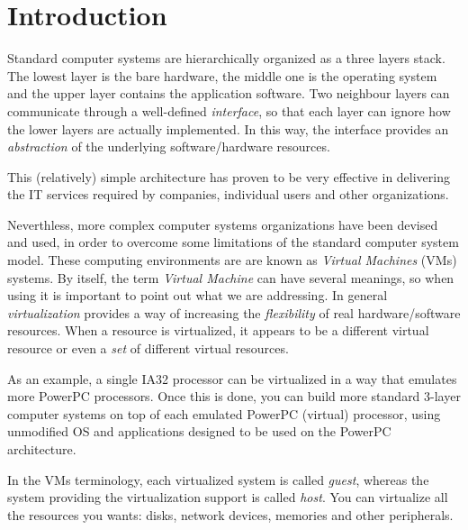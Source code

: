 \chapter{Introduction}

Standard computer systems are hierarchically organized as a three
layers stack. The lowest layer is the bare hardware, the middle one is the operating system and the 
upper layer contains the application software.
Two neighbour layers can communicate through a well-defined \emph{interface}, so that each layer can ignore how the
lower layers are actually implemented. In this way, the interface provides an \emph{abstraction} of the underlying software/hardware
resources.

This (relatively) simple architecture has proven to be very effective in delivering the IT services required
by companies, individual users and other organizations.

\vspace{0.5cm}

Neverthless, more complex computer systems organizations have been devised and used, in order to overcome some limitations
of the standard computer system model. These computing environments are are known as \emph{Virtual Machines} (VMs) systems.
By itself, the term \emph{Virtual Machine} can have several meanings, so when using it is important to point out what we are
addressing.
In general \emph{virtualization} provides a way of increasing the \emph{flexibility} of real hardware/software resources. When a 
resource  is virtualized, it appears to be a different virtual resource or even a \emph{set} of different virtual resources.

As an example, a single IA32 processor can be virtualized in a way that emulates more PowerPC processors. Once this is done, you
can build more standard 3-layer computer systems on top of each emulated PowerPC (virtual) processor, using unmodified OS and 
applications designed to be used on the PowerPC architecture.

In the VMs terminology, each virtualized system is called \emph{guest}, whereas the system providing the virtualization support
is called \emph{host}.
You can virtualize all the resources you wants: disks, network devices, memories and other peripherals.

\vspace{0.5cm}

